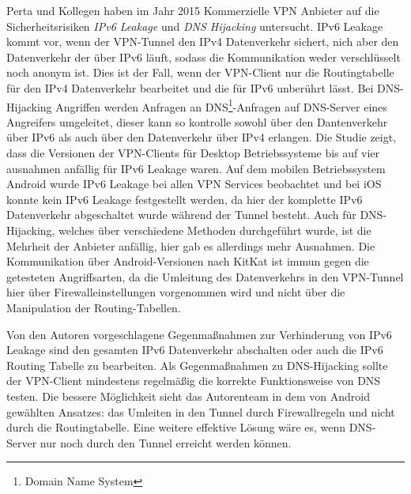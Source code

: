 Perta und Kollegen \cite{perta2015glance} haben im Jahr 2015 Kommerzielle VPN Anbieter auf die Sicherheitsrisiken \emph{IPv6 Leakage} und \emph{DNS Hijacking} untersucht. IPv6 Leakage kommt vor, wenn der VPN-Tunnel den  IPv4 Datenverkehr sichert, nich aber den Datenverkehr der über IPv6 läuft, sodass die Kommunikation weder verschlüsselt noch anonym ist. Dies ist der Fall, wenn der VPN-Client nur die Routingtabelle für den IPv4 Datenverkehr bearbeitet und die für IPv6 unberührt lässt. 
 Bei DNS-Hijacking Angriffen werden Anfragen an DNS\footnote{Domain Name System}-Anfragen auf DNS-Server eines Angreifers umgeleitet, dieser kann so kontrolle sowohl über den Dantenverkehr über IPv6 als auch über den Datenverkehr über IPv4 erlangen. 
Die Studie zeigt, dass die Versionen der VPN-Clients für Desktop Betriebssysteme bis auf vier ausnahmen anfällig für IPv6 Leakage waren. Auf dem mobilen Betriebssystem Android wurde IPv6 Leakage bei allen VPN Services beobachtet und bei iOS konnte kein IPv6 Leakage festgestellt werden, da hier der komplette IPv6 Datenverkehr abgeschaltet wurde während der Tunnel besteht. 
Auch für DNS-Hijacking, welches über verschiedene Methoden durchgeführt wurde, ist die Mehrheit der Anbieter anfällig, hier gab es allerdings mehr Ausnahmen. Die Kommunikation über Android-Versionen nach KitKat ist immun gegen die getesteten Angriffsarten, da die Umleitung des Datenverkehrs in den VPN-Tunnel hier über Firewalleinstellungen vorgenommen wird und nicht über die Manipulation der Routing-Tabellen. 

Von den Autoren vorgeschlagene Gegenmaßnahmen zur Verhinderung von IPv6 Leakage sind
 den gesamten IPv6 Datenverkehr abschalten oder auch die IPv6 Routing Tabelle zu bearbeiten. 
 Als Gegenmaßnahmen zu DNS-Hijacking sollte der VPN-Client mindestens regelmäßig die korrekte Funktionsweise von DNS testen. Die bessere Möglichkeit sieht das Autorenteam in dem von Android gewählten Ansatzes: das Umleiten in den Tunnel durch Firewallregeln und nicht durch die Routingtabelle. Eine weitere effektive Lösung wäre es, wenn DNS-Server nur noch durch den Tunnel erreicht werden können. 
  


 






